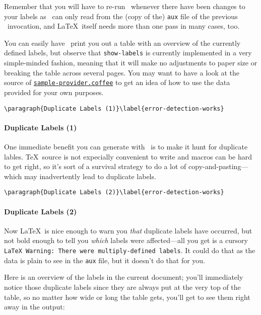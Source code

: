 Remember that you will have to re-run \XeLaTeX\ whenever there have been
changes to your labels as \CXLTX\ can only read from the (copy of the) \verb#aux# file of the previous
\XeLaTeX\ invocation, and \LaTeX\ itself needs more than one pass in many cases, too.

You can easily have \CXLTX\ print you out a table with an overview of the currently defined labels, but observe
that \verb#show-labels# is currently implemented in a very simple-minded fashion, meaning that it will make
no adjustments to paper size or breaking the table across several pages. You may want to have a look at
the source of \href{https://github.com/loveencounterflow/cxltx/blob/master/src/sample-provider.coffee#L93}{\texttt{sample-provider.coffee}}
to get an idea of how to use the data provided for your own purposes.

\verb#\paragraph{Duplicate Labels (1)}\label{error-detection-works}#
\paragraph{Duplicate Labels (1)}\label{error-detection-works}

One immediate benefit you can generate with \CXLTX\ is to make it hunt for duplicate lables. \TeX\ source
is not expecially convenient to write and macros can be hard to get right, so it's sort of a survival
strategy to do a lot of copy-and-pasting---which may inadvertently lead to duplicate labels.

\verb#\paragraph{Duplicate Labels (2)}\label{error-detection-works}#
\paragraph{Duplicate Labels (2)}\label{error-detection-works}

Now \LaTeX\ is nice enough to warn you {\em that} duplicate labels have occurred, but not bold enough
to tell you {\em which} labels were affected---all you get is a cursory \texttt{LaTeX Warning: There were
multiply-defined labels}. It could do that as the data is plain to see in the \verb#aux#
file, but it doesn't do that for you.

Here is an overview of the labels in the current document; you'll immediately notice those duplicate labels
since they are always put at the very top of the table, so no matter how wide or long the table gets, you'll get to
see them right away in the output:


